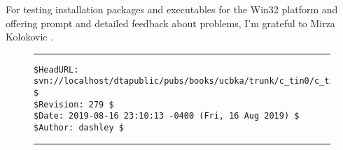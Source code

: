 For testing installation packages and executables for the 
Win32 platform and offering
prompt and detailed feedback about problems, I'm grateful to
Mirza Kolokovic \cite{bibref:i:mirzakolakovic}.

\noindent\begin{figure}[!b]
\noindent\rule[-0.25in]{\textwidth}{1pt}
\begin{tiny}
\begin{verbatim}
$HeadURL: svn://localhost/dtapublic/pubs/books/ucbka/trunk/c_tin0/c_tin0.tex $
$Revision: 279 $
$Date: 2019-08-16 23:10:13 -0400 (Fri, 16 Aug 2019) $
$Author: dashley $
\end{verbatim}
\end{tiny}
\noindent\rule[0.25in]{\textwidth}{1pt}
\end{figure}
%
